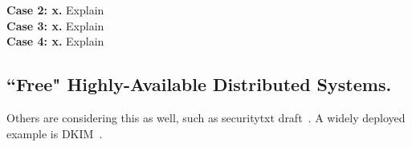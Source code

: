\noindent\textbf{Case 2: x.}    Explain \\

\noindent\textbf{Case 3: x.}    Explain \\

\noindent\textbf{Case 4: x.}    Explain \\

\subsection{``Free" Highly-Available Distributed Systems.}

Others are considering this as well, such as securitytxt
draft~\cite{draft-sectxt}. A widely deployed example is DKIM~\cite{DKIM}.
